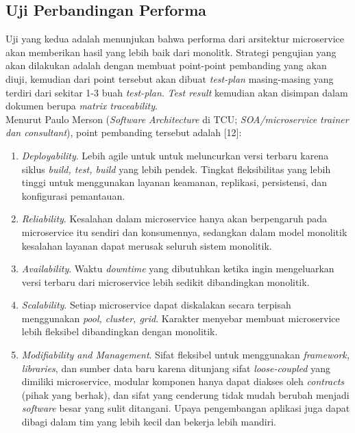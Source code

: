 \subsection{Uji Perbandingan Performa}
Uji yang kedua adalah menunjukan bahwa performa dari arsitektur microservice akan memberikan hasil yang lebih baik dari monolitk. Strategi pengujian yang akan dilakukan adalah dengan membuat point-point pembanding yang akan diuji, kemudian dari point tersebut akan dibuat \textit{test-plan} masing-masing yang terdiri dari sekitar 1-3 buah \textit{test-plan}. \textit{Test result} kemudian akan disimpan dalam dokumen berupa \textit{matrix traceability}.\\
Menurut Paulo Merson (\textit{Software Architecture} di TCU; \textit{SOA/microservice trainer dan consultant}), point pembanding tersebut adalah [12]:

\begin{enumerate}[leftmargin=*]
	\item \textit{Deployability}. Lebih agile untuk untuk meluncurkan versi terbaru karena siklus \textit{build, test, build} yang lebih pendek. Tingkat fleksibilitas yang lebih tinggi untuk menggunakan layanan keamanan, replikasi, persistensi, dan konfigurasi pemantauan.
	\item \textit{Reliability}. Kesalahan dalam microservice hanya akan berpengaruh pada microservice itu sendiri dan konsumennya, sedangkan dalam model monolitik kesalahan layanan dapat merusak seluruh sistem monolitik.
	\item \textit{Availability}. Waktu \textit{downtime} yang dibutuhkan ketika ingin mengeluarkan versi terbaru dari microservice lebih sedikit dibandingkan monolitik.
	\item \textit{Scalability}. Setiap microservice dapat diskalakan secara terpisah menggunakan \textit{pool, cluster, grid}. Karakter menyebar membuat microservice lebih fleksibel dibandingkan dengan monolitik.
	\item \textit{Modifiability and Management}. Sifat fleksibel untuk menggunakan \textit{framework, libraries}, dan sumber data baru karena ditunjang sifat \textit{loose-coupled} yang dimiliki microservice, modular komponen hanya dapat diakses oleh \textit{contracts} (pihak yang berhak), dan sifat yang cenderung tidak mudah berubah menjadi \textit{software} besar yang sulit ditangani. Upaya pengembangan aplikasi juga dapat dibagi dalam tim yang lebih kecil dan bekerja lebih mandiri.
\end{enumerate}

